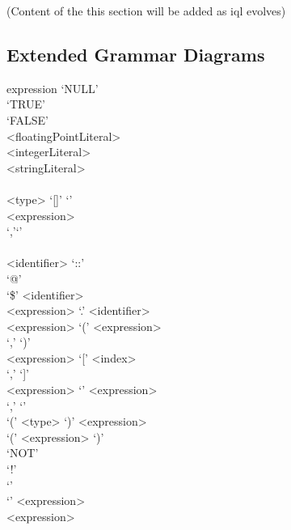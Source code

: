 \documentclass[11pt,a4paper]{article}
\begin{document}
(Content of the this section will be added as \ac{iql} evolves)



\begin{appendices}
\section{Extended Grammar Diagrams}


\begin{gram*}
	\label{gram:expression}
	\begin{rrdiag*}{expression}
		\sst
		`NULL' \\
		`TRUE' \\
		`FALSE' \\
		<floatingPointLiteral> \\
		<integerLiteral> \\
		<stringLiteral> \\
		\sst \\ <type> `[]' \est `{' \sst \\ \srp <expression> \\ `,'\erp \est `}' \\
		\sst \\ <identifier> `::' \\ `@' \\ `\$' \est <identifier> \\
		<expression> `.' <identifier> \\ %
		<expression> `(' \srp <expression> \\ `,' \erp `)' \\ %
		<expression> `[' \srp <index> \\ `,' \erp `]' \\ %
		<expression> `{' \srp <expression> \\  `,' \erp `}' \\ %
		`(' <type> `)' <expression> \\ %
		`(' <expression> `)' \\ %
		\sst `NOT' \\ `!' \\ `\textminus' \\ `\texttildelow' \est <expression> \\ %
		<expression> \sst 
		 \\ 
		 \\ 
		 \\ 

\end{rrdiag*}
\end{gram*}
\end{appendices}
\end{document}
